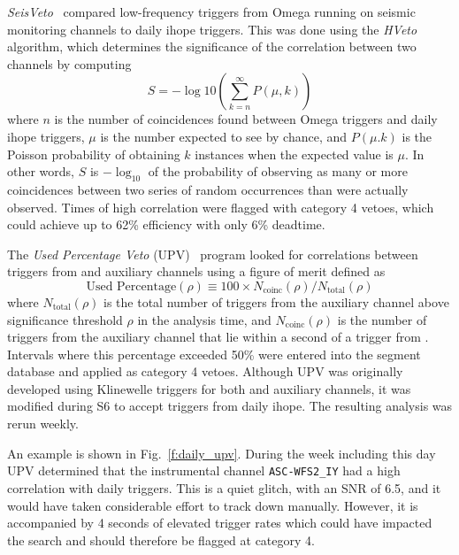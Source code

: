 \emph{SeisVeto}~\cite{Macleod:2011} compared low-frequency triggers
from Omega running on seismic monitoring channels to daily ihope
triggers.  This was done using the \emph{HVeto}~\cite{Smith:2011}
algorithm, which determines the significance of the correlation
between two channels by computing
%
\begin{equation*} S = -\log{10}\left(\sum_{k=n}^\infty P(\mu,k)\right)
\end{equation*}
%
where $n$ is the number of coincidences found between Omega triggers
and daily ihope triggers, $\mu$ is the number expected to see by
chance, and $P(\mu.k)$ is the Poisson probability of obtaining $k$
instances when the expected value is $\mu$.  In other words, $S$ is
$-\log_{10}$ of the probability of observing as many or more
coincidences between two series of random occurrences than were
actually observed.  Times of high correlation were flagged with
category 4 vetoes, which could achieve up to 62\% efficiency with only
6\% deadtime.

The \emph{Used Percentage Veto} (UPV)~\cite{Isogai:2010} program
looked for correlations between triggers from \darmerr and auxiliary
channels using a figure of merit defined as
%
\begin{equation*}
\textrm{Used Percentage}(\rho) \equiv 100 \times
N_\textrm{coinc}(\rho) / N_\textrm{total}(\rho)
\end{equation*}
%
where $N_\textrm{total}(\rho)$ is the total number of triggers from
the auxiliary channel above significance threshold $\rho$ in the
analysis time, and $N_\textrm{coinc}(\rho)$ is the number of triggers
from the auxiliary channel that lie within a second of a trigger from
\darmerr.  Intervals where this percentage exceeded 50\% were entered
into the segment database and applied as category 4 vetoes.  Although
UPV was originally developed using Klinewelle triggers for both \darmerr and
auxiliary channels, it was modified during S6 to accept triggers from
daily ihope.  The resulting analysis was rerun weekly.



An example is shown in Fig.~\ref{f:daily_upv}.  During the week
including this day UPV determined that the instrumental channel
\texttt{ASC-WFS2\_IY} had a high correlation with daily triggers.
This is a quiet glitch, with an SNR of 6.5, and it would have taken
considerable effort to track down manually.  However, it is
accompanied by 4 seconds of elevated trigger rates which could have
impacted the search and should therefore be flagged at category 4.


